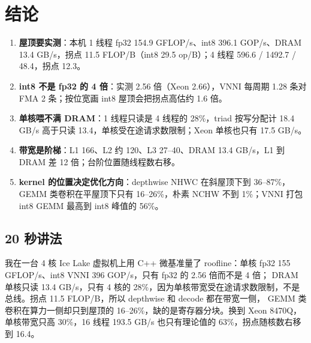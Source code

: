 \documentclass[11pt,a4paper]{ctexart}
\begin{document}
\section{结论}\label{sec:conclusion}

\begin{findingbox}[：本实验的五条结论]
\begin{enumerate}[label=(\arabic*)]
  \item \textbf{屋顶要实测}：本机 1 线程 fp32 154.9 GFLOP/s、int8 396.1 GOP/s、DRAM 13.4 GB/s，拐点 11.5 FLOP/B（int8 29.5 op/B）；4 线程 596.6 / 1492.7 / 48.4，拐点 12.3。
  \item \textbf{int8 不是 fp32 的 4 倍}：实测 2.56 倍（Xeon 2.66），VNNI 每周期 1.28 条对 FMA 2 条；按位宽画 int8 屋顶会把拐点高估约 1.6 倍。
  \item \textbf{单核喂不满 DRAM}：1 线程只读是 4 线程的 28\%，triad 按写分配计 18.4 GB/s 高于只读 13.4，单核受在途请求数限制；Xeon 单核也只有 17.5 GB/s。
  \item \textbf{带宽是阶梯}：L1 166、L2 约 120、L3 27--40、DRAM 13.4 GB/s，L1 到 DRAM 差 12 倍；台阶位置随线程数右移。
  \item \textbf{kernel 的位置决定优化方向}：depthwise NHWC 在斜屋顶下到 36--87\%，GEMM 类卷积在平屋顶下只有 16--26\%，朴素 NCHW 不到 1\%；VNNI 打包 int8 GEMM 最高到 int8 峰值的 56\%。
\end{enumerate}
\end{findingbox}

\subsection*{20 秒讲法}

我在一台 4 核 Ice Lake 虚拟机上用 C++ 微基准量了 roofline：单核 fp32 155 GFLOP/s、int8 VNNI 396 GOP/s，只有 fp32 的 2.56 倍而不是 4 倍；
DRAM 单核只读 13.4 GB/s，只有 4 核的 28\%，因为单核带宽受在途请求数限制，不是总线。拐点 11.5 FLOP/B，所以 depthwise 和 decode 都在带宽一侧，
GEMM 类卷积在算力一侧却只到屋顶的 16--26\%，缺的是寄存器分块。换到 Xeon 8470Q，单核带宽只高 30\%，16 线程 193.5 GB/s 也只有理论值的 63\%，拐点随核数右移到 16.4。
\end{document}
